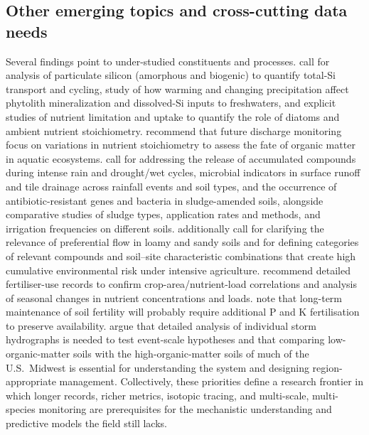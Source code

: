 \documentclass[11pt]{article}
\begin{document}
\subsection{Other emerging topics and cross-cutting data needs}

Several findings point to under-studied constituents and processes. \textcite{Sethna2022} call for analysis of particulate silicon (amorphous and biogenic) to quantify total-Si transport and cycling, study of how warming and changing precipitation affect phytolith mineralization and dissolved-Si inputs to freshwaters, and explicit studies of nutrient limitation and uptake to quantify the role of diatoms and ambient nutrient stoichiometry. \textcite{Manninen2023} recommend that future discharge monitoring focus on variations in nutrient stoichiometry to assess the fate of organic matter in aquatic ecosystems. \textcite{Ghirardini2019} call for addressing the release of accumulated compounds during intense rain and drought/wet cycles, microbial indicators in surface runoff and tile drainage across rainfall events and soil types, and the occurrence of antibiotic-resistant genes and bacteria in sludge-amended soils, alongside comparative studies of sludge types, application rates and methods, and irrigation frequencies on different soils. \textcite{Gramlich2018} additionally call for clarifying the relevance of preferential flow in loamy and sandy soils and for defining categories of relevant compounds and soil--site characteristic combinations that create high cumulative environmental risk under intensive agriculture. \textcite{DambenieceMigliniece2018} recommend detailed fertiliser-use records to confirm crop-area/nutrient-load correlations and analysis of seasonal changes in nutrient concentrations and loads. \textcite{Norberg2025} note that long-term maintenance of soil fertility will probably require additional P and K fertilisation to preserve availability. \textcite{Kladivko2004} argue that detailed analysis of individual storm hydrographs is needed to test event-scale hypotheses and that comparing low-organic-matter soils with the high-organic-matter soils of much of the U.S.\ Midwest is essential for understanding the system and designing region-appropriate management. Collectively, these priorities define a research frontier in which longer records, richer metrics, isotopic tracing, and multi-scale, multi-species monitoring are prerequisites for the mechanistic understanding and predictive models the field still lacks.

\printbibliography
\end{document}
